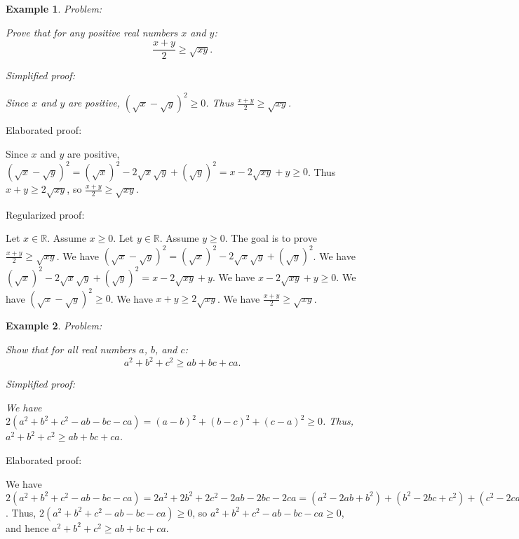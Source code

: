 \documentclass{article}
\newtheorem{example}{Example}
\begin{document}
\begin{example}
Problem:
\begin{tcolorbox}[colback=yellow!10, width=\linewidth]
Prove that for any positive real numbers $x$ and $y$:
    $$\frac{x+y}{2} \geq \sqrt{xy}.$$
\end{tcolorbox}

Simplified proof:
\begin{tcolorbox}[colback=blue!10, width=\linewidth]
Since $x$ and $y$ are positive, $(\sqrt x - \sqrt y)^2 \ge 0$. Thus $\frac{x+y}{2} \ge \sqrt{xy}$.
\end{tcolorbox}
\end{example}

Elaborated proof:
\begin{tcolorbox}[colback=green!10, width=\linewidth]
Since $x$ and $y$ are positive, $(\sqrt x - \sqrt y)^2 = (\sqrt x)^2 - 2\sqrt x \sqrt y + (\sqrt y)^2 = x - 2\sqrt{xy} + y \ge 0$. Thus $x + y \ge 2\sqrt{xy}$, so $\frac{x+y}{2} \ge \sqrt{xy}$.
\end{tcolorbox}

Regularized proof:
\begin{tcolorbox}[colback=red!10, width=\linewidth]
Let $x\in\mathbb{R}$. Assume $x\ge 0$.
Let $y\in\mathbb{R}$. Assume $y\ge 0$.
The goal is to prove $\frac{x+y}{2} \ge \sqrt{xy}$.
We have ${{(\sqrt x - \sqrt y)}}^2 = {{(\sqrt x)}}^2 - 2\sqrt x \sqrt y + {{(\sqrt y)}}^2$.
We have ${{(\sqrt x)}}^2 - 2\sqrt x \sqrt y + {{(\sqrt y)}}^2 = x - 2\sqrt{xy} + y$.
We have $x - 2\sqrt{xy} + y \ge 0$.
We have ${{(\sqrt x - \sqrt y)}}^2 \ge 0$.
We have $x + y \ge 2\sqrt{xy}$.
We have $\frac{x+y}{2} \ge \sqrt{xy}$.
\end{tcolorbox}


\begin{example}
Problem:
\begin{tcolorbox}[colback=yellow!10, width=\linewidth]
Show that for all real numbers $a$, $b$, and $c$:
    $$a^2 + b^2 + c^2 \geq ab + bc + ca.$$
\end{tcolorbox}

Simplified proof:
\begin{tcolorbox}[colback=blue!10, width=\linewidth]
We have $2(a^2 + b^2 + c^2 - ab - bc - ca) = (a-b)^2 + (b-c)^2 + (c-a)^2 \ge 0$. Thus, $a^2 + b^2 + c^2 \geq ab + bc + ca$.
\end{tcolorbox}
\end{example}

Elaborated proof:
\begin{tcolorbox}[colback=green!10, width=\linewidth]
We have $2(a^2 + b^2 + c^2 - ab - bc - ca) = 2a^2 + 2b^2 + 2c^2 - 2ab - 2bc - 2ca = (a^2 - 2ab + b^2) + (b^2 - 2bc + c^2) + (c^2 - 2ca + a^2) = (a-b)^2 + (b-c)^2 + (c-a)^2 \ge 0$. Thus, $2(a^2 + b^2 + c^2 - ab - bc - ca) \ge 0$, so $a^2 + b^2 + c^2 - ab - bc - ca \ge 0$, and hence $a^2 + b^2 + c^2 \geq ab + bc + ca$.
\end{tcolorbox}
\end{document}
